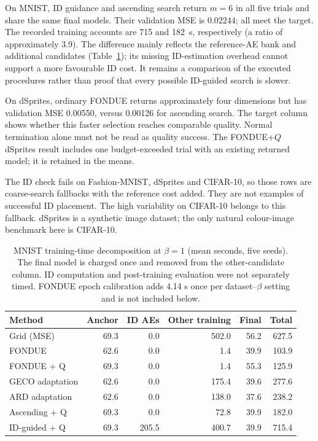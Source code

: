 \documentclass[make,article,submit,pdftex,moreauthors]{Definitions/mdpi}
\begin{document}
On MNIST, ID guidance and ascending search return $m=6$ in all five
trials and share the same final models. Their validation MSE is 0.02244;
all meet the target. The recorded training accounts are 715 and 182~s,
respectively (a ratio of approximately 3.9). The difference mainly
reflects the reference-AE bank and additional candidates
(Table~\ref{tab:cost}); its missing ID-estimation overhead cannot support
a more favourable ID cost. It remains a comparison of the executed
procedures rather than proof that every possible ID-guided search is
slower.

On dSprites, ordinary FONDUE returns approximately four dimensions but
has validation MSE 0.00550, versus 0.00126 for ascending search. The
target column shows whether this faster selection reaches comparable
quality. Normal termination alone must not be read as quality success.
The FONDUE+$Q$ dSprites result includes one budget-exceeded trial with
an existing returned model; it is retained in the means.

The ID check fails on Fashion-MNIST, dSprites and CIFAR-10, so those
rows are coarse-search fallbacks with the reference cost added. They are
not examples of successful ID placement. The high variability on
CIFAR-10 belongs to this fallback. dSprites is a synthetic image dataset;
the only natural colour-image benchmark here is CIFAR-10.

\begin{table}[H]
\caption{MNIST training-time decomposition at $\beta=1$ (mean seconds, five seeds). The final model is charged once and removed from the other-candidate column. ID computation and post-training evaluation were not separately timed. FONDUE epoch calibration adds 4.14 s once per dataset--$\beta$ setting and is not included below.}\label{tab:cost}
\footnotesize
\setlength{\tabcolsep}{3.5pt}
\begin{tabular*}{\textwidth}{@{\extracolsep{\fill}}lrrrrr@{}}
\toprule
Method & Anchor & ID AEs & Other training & Final & Total \\
\midrule
Grid (MSE) & 69.3 & 0.0 & 502.0 & 56.2 & 627.5 \\
FONDUE & 62.6 & 0.0 & 1.4 & 39.9 & 103.9 \\
FONDUE + Q & 69.3 & 0.0 & 1.4 & 55.3 & 125.9 \\
GECO adaptation & 62.6 & 0.0 & 175.4 & 39.6 & 277.6 \\
ARD adaptation & 62.6 & 0.0 & 138.0 & 37.6 & 238.2 \\
Ascending + Q & 69.3 & 0.0 & 72.8 & 39.9 & 182.0 \\
ID-guided + Q & 69.3 & 205.5 & 400.7 & 39.9 & 715.4 \\
\bottomrule
\end{tabular*}
\end{table}
\end{document}
